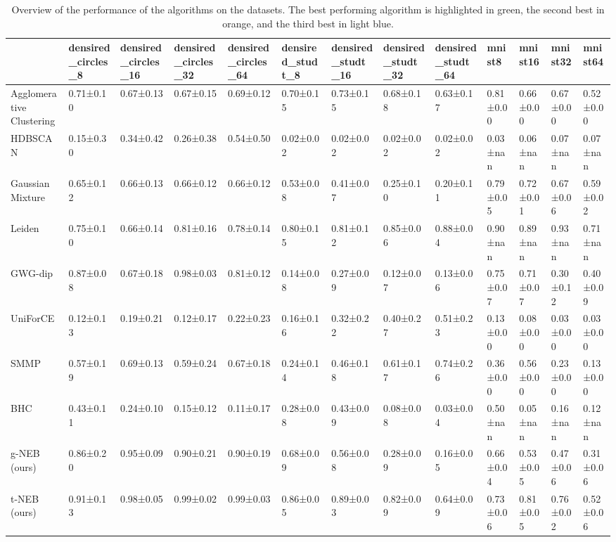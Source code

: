 \begin{table}
\caption{Overview of the performance of the algorithms on the datasets. The best performing algorithm is highlighted in green, the second best in orange, and the third best in light blue.}
\label{tab:overview_hd}
\begin{tabular}{lllllllllllll}
\toprule
 & densired_circles_8 & densired_circles_16 & densired_circles_32 & densired_circles_64 & densired_studt_8 & densired_studt_16 & densired_studt_32 & densired_studt_64 & mnist8 & mnist16 & mnist32 & mnist64 \\
\midrule
Agglomerative Clustering & 0.71±0.10 & 0.67±0.13 & 0.67±0.15 & 0.69±0.12 & 0.70±0.15 & 0.73±0.15 & 0.68±0.18 & 0.63±0.17 & 0.81±0.00 & 0.66±0.00 & 0.67±0.00 & 0.52±0.00 \\
HDBSCAN & 0.15±0.30 & 0.34±0.42 & 0.26±0.38 & 0.54±0.50 & 0.02±0.02 & 0.02±0.02 & 0.02±0.02 & 0.02±0.02 & 0.03±nan & 0.06±nan & 0.07±nan & 0.07±nan \\
Gaussian Mixture & 0.65±0.12 & 0.66±0.13 & 0.66±0.12 & 0.66±0.12 & 0.53±0.08 & 0.41±0.07 & 0.25±0.10 & 0.20±0.11 & 0.79±0.05 & 0.72±0.01 & 0.67±0.06 & 0.59±0.02 \\
Leiden & 0.75±0.10 & 0.66±0.14 & 0.81±0.16 & 0.78±0.14 & 0.80±0.15 & 0.81±0.12 & 0.85±0.06 & 0.88±0.04 & 0.90±nan & 0.89±nan & 0.93±nan & 0.71±nan \\
GWG-dip & 0.87±0.08 & 0.67±0.18 & 0.98±0.03 & 0.81±0.12 & 0.14±0.08 & 0.27±0.09 & 0.12±0.07 & 0.13±0.06 & 0.75±0.07 & 0.71±0.07 & 0.30±0.12 & 0.40±0.09 \\
UniForCE & 0.12±0.13 & 0.19±0.21 & 0.12±0.17 & 0.22±0.23 & 0.16±0.16 & 0.32±0.22 & 0.40±0.27 & 0.51±0.23 & 0.13±0.00 & 0.08±0.00 & 0.03±0.00 & 0.03±0.00 \\
SMMP & 0.57±0.19 & 0.69±0.13 & 0.59±0.24 & 0.67±0.18 & 0.24±0.14 & 0.46±0.18 & 0.61±0.17 & 0.74±0.26 & 0.36±0.00 & 0.56±0.00 & 0.23±0.00 & 0.13±0.00 \\
BHC & 0.43±0.11 & 0.24±0.10 & 0.15±0.12 & 0.11±0.17 & 0.28±0.08 & 0.43±0.09 & 0.08±0.08 & 0.03±0.04 & 0.50±nan & 0.05±nan & 0.16±nan & 0.12±nan \\
g-NEB (ours) & 0.86±0.20 & 0.95±0.09 & 0.90±0.21 & 0.90±0.19 & 0.68±0.09 & 0.56±0.08 & 0.28±0.09 & 0.16±0.05 & 0.66±0.04 & 0.53±0.05 & 0.47±0.06 & 0.31±0.06 \\
t-NEB (ours) & 0.91±0.13 & 0.98±0.05 & 0.99±0.02 & 0.99±0.03 & 0.86±0.05 & 0.89±0.03 & 0.82±0.09 & 0.64±0.09 & 0.73±0.06 & 0.81±0.05 & 0.76±0.02 & 0.52±0.06 \\
\bottomrule
\end{tabular}
\end{table}
